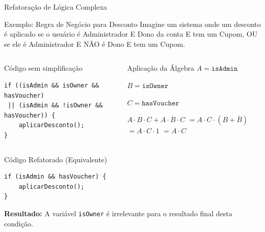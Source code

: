 \documentclass[9pt]{beamer}
\begin{document}
\begin{frame}[fragile]{Refatoração de Lógica Complexa}

\begin{block}{Exemplo: Regra de Negócio para Desconto}
Imagine um sistema onde um desconto é aplicado se o usuário é Administrador E Dono da conta E tem um Cupom, OU se ele é Administrador E NÃO é Dono E tem um Cupom.
\end{block}

\begin{columns}


\begin{alertblock}{Código sem simplificação}
\begin{verbatim}
if ((isAdmin && isOwner && hasVoucher) 
 || (isAdmin && !isOwner && hasVoucher)) {
    aplicarDesconto();
}
\end{verbatim}
\end{alertblock}


\begin{block}{Aplicação da Álgebra}
$A = \texttt{isAdmin}$

$B = \texttt{isOwner}$

$C = \texttt{hasVoucher}$

\vspace{0.2cm}
$A \cdot B \cdot C + A \cdot \overline{B} \cdot C$
$= A \cdot C \cdot (B + \overline{B})$
$= A \cdot C \cdot 1$
$= \boxed{A \cdot C}$
\end{block}

\end{columns}

\vspace{0.2cm}

\begin{block}{Código Refatorado (Equivalente)}
\begin{verbatim}
if (isAdmin && hasVoucher) {
    aplicarDesconto();
}
\end{verbatim}
\textcolor{structure}{\footnotesize \textbf{Resultado:} A variável \texttt{isOwner} é \alert{irrelevante} para o resultado final desta condição.}
\end{block}

\end{frame}
\end{document}
